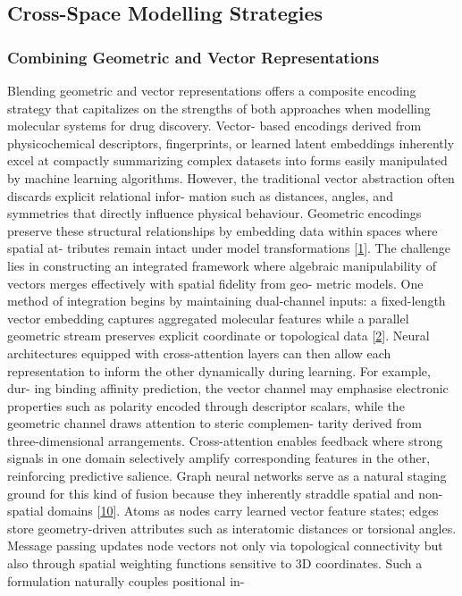 \documentclass[
]{article}
\begin{document}
\subsection{Cross-Space Modelling
Strategies}\label{cross-space-modelling-strategies}

\subsubsection{Combining Geometric and Vector
Representations}\label{combining-geometric-and-vector-representations}

Blending geometric and vector representations offers a composite
encoding strategy that capitalizes on the strengths of both approaches
when modelling molecular systems for drug discovery. Vector- based
encodings derived from physicochemical descriptors, fingerprints, or
learned latent embeddings inherently excel at compactly summarizing
complex datasets into forms easily manipulated by machine learning
algorithms. However, the traditional vector abstraction often discards
explicit relational infor- mation such as distances, angles, and
symmetries that directly influence physical behaviour. Geometric
encodings preserve these structural relationships by embedding data
within spaces where spatial at- tributes remain intact under model
transformations {[}\hyperref[_bookmark41]{1}{]}. The challenge lies in
constructing an integrated framework where algebraic manipulability of
vectors merges effectively with spatial fidelity from geo- metric
models. One method of integration begins by maintaining dual-channel
inputs: a fixed-length vector embedding captures aggregated molecular
features while a parallel geometric stream preserves explicit coordinate
or topological data {[}\hyperref[_bookmark42]{2}{]}. Neural
architectures equipped with cross-attention layers can then allow each
representation to inform the other dynamically during learning. For
example, dur- ing binding affinity prediction, the vector channel may
emphasise electronic properties such as polarity encoded through
descriptor scalars, while the geometric channel draws attention to
steric complemen- tarity derived from three-dimensional arrangements.
Cross-attention enables feedback where strong signals in one domain
selectively amplify corresponding features in the other, reinforcing
predictive salience. Graph neural networks serve as a natural staging
ground for this kind of fusion because they inherently straddle spatial
and non-spatial domains {[}\hyperref[_bookmark50]{10}{]}. Atoms as nodes
carry learned vector feature states; edges store geometry-driven
attributes such as interatomic distances or torsional angles. Message
passing updates node vectors not only via topological connectivity but
also through spatial weighting functions sensitive to 3D coordinates.
Such a formulation naturally couples positional in-
\end{document}
